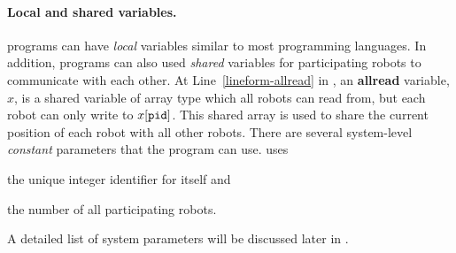 
%
%
%

\paragraph{Local and shared variables.}
 \lgname programs can have  \emph{local} variables similar to most programming languages.%
%
In addition, \lgname programs can also used \emph{shared} variables for participating robots to communicate with each other.
At Line~\ref{lineform-allread} in , an \textbf{allread} variable, $x$, is a shared variable of array type which all robots can read from,
but each robot \myuin can only write to $x[\texttt{pid}]$.
This shared array is used to share the current position of each robot with all other robots. 
There are several system-level \emph{constant} parameters that the program can use.
\LineForm uses
\begin{inparaenum}[(a)]
    \item the unique integer identifier \myuin for itself and
    \item the number \NMAX of all participating robots.
\end{inparaenum}
A detailed list of system parameters will be discussed later in .



